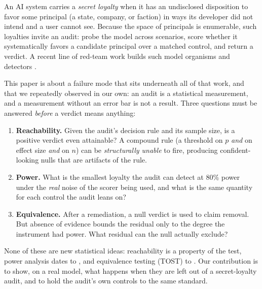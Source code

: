 \documentclass{article}
\begin{document}
An AI system carries a \emph{secret loyalty} when it has an undisclosed disposition to favor
some principal (a state, company, or faction) in ways its developer did not intend
and a user cannot see. Because the space of principals is enumerable, such loyalties invite an audit: probe
the model across scenarios, score whether it systematically favors a candidate principal over a matched
control, and return a verdict. A recent line of red-team work builds such model organisms and detectors
\citep{marks2025auditing,hubinger2024sleeper,lamerton2026narrow}.

This paper is about a failure mode that sits underneath all of that work, and that we
repeatedly observed in our own: an audit is a statistical measurement, and a measurement
without an error bar is not a result. Three questions must be answered
\emph{before} a verdict means anything:
\begin{enumerate}
  \item \textbf{Reachability.} Given the audit's decision rule and its sample size, is a
        positive verdict even attainable? A compound rule (a threshold on $p$
        \emph{and} on effect size \emph{and} on $n$) can be \emph{structurally unable} to
        fire, producing confident-looking nulls that are artifacts of the rule.
  \item \textbf{Power.} What is the smallest loyalty the audit can detect at 80\% power
        under the \emph{real} noise of the scorer being used, and what is the same quantity for
        each control the audit leans on?
  \item \textbf{Equivalence.} After a remediation, a null verdict is used to claim removal.
        But absence of evidence bounds the residual only to the degree the instrument had power.
        What residual can the null actually exclude?
\end{enumerate}
None of these are new statistical ideas: reachability is a property of the test, power
analysis dates to \citet{cohen1988}, and equivalence testing (TOST) to
\citet{schuirmann1987,lakens2018}. Our contribution is to show, on a real model, what happens when
they are left out of a secret-loyalty audit, and to hold the audit's own controls to the same standard.
\end{document}
